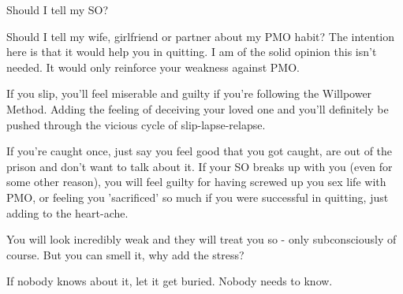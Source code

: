 Should I tell my SO?

Should I tell my wife, girlfriend or partner about my PMO habit? The intention here is that it would help you in quitting. I am of the solid opinion this isn't needed. It would only reinforce your weakness against PMO.

If you slip, you'll feel miserable and guilty if you're following the Willpower Method. Adding the feeling of deceiving your loved one and you'll definitely be pushed through the vicious cycle of slip-lapse-relapse.

If you're caught once, just say you feel good that you got caught, are out of the prison and don't want to talk about it. If your SO breaks up with you (even for some other reason), you will feel guilty for having screwed up you sex life with PMO, or feeling you 'sacrificed' so much if you were successful in quitting, just adding to the heart-ache.

You will look incredibly weak and they will treat you so - only subconsciously of course. But you can smell it, why add the stress?

If nobody knows about it, let it get buried. Nobody needs to know.

